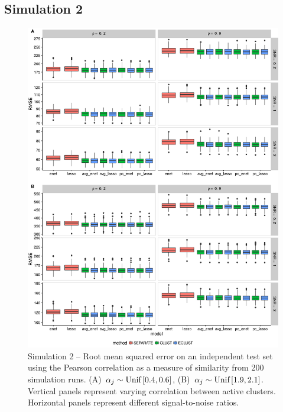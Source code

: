 \subsection*{Simulation 2}
\begin{figure}[h]
	\centering
	\includegraphics[scale=0.55, keepaspectratio]{./figs/hydra/results/figures/sim2-sept8/RMSE_Correlation_sim2.png}
	\caption{Simulation 2 -- Root mean squared error on an independent test set using the Pearson correlation as a measure of similarity from 200 simulation runs. \mbox{(A) $\alpha_{j} \sim \textrm{{Unif}}\left[0.4, 0.6\right]$}, \mbox{(B) $\alpha_{j} \sim \textrm{{Unif}}\left[1.9, 2.1\right]$}. Vertical panels represent varying correlation between active clusters. Horizontal panels represent different signal-to-noise ratios.}
	\label{fig:RMSE_Correlation_sim2}
\end{figure}

